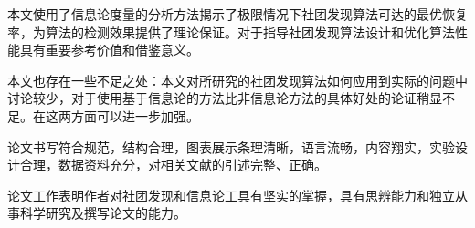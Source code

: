 
\begin{comments}
    本文使用了信息论度量的分析方法揭示了极限情况下社团发现算法可达的最优恢复率，为算法的检测效果提供了理论保证。对于指导社团发现算法设计和优化算法性能具有重要参考价值和借鉴意义。

    本文也存在一些不足之处：本文对所研究的社团发现算法如何应用到实际的问题中讨论较少，对于使用基于信息论的方法比非信息论方法的具体好处的论证稍显不足。在这两方面可以进一步加强。
    
    论文书写符合规范，结构合理，图表展示条理清晰，语言流畅，内容翔实，实验设计合理，数据资料充分，对相关文献的引述完整、正确。
    
    论文工作表明作者对社团发现和信息论工具有坚实的掌握，具有思辨能力和独立从事科学研究及撰写论文的能力。
\end{comments}
